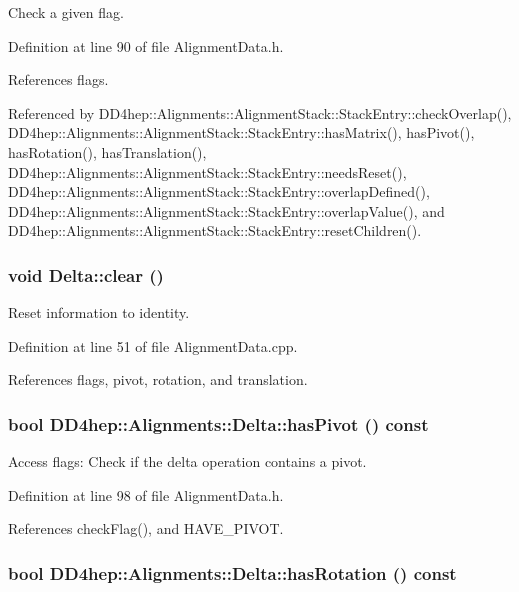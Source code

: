 Check a given flag. 

Definition at line 90 of file AlignmentData.h.

References flags.

Referenced by DD4hep::Alignments::AlignmentStack::StackEntry::checkOverlap(), DD4hep::Alignments::AlignmentStack::StackEntry::hasMatrix(), hasPivot(), hasRotation(), hasTranslation(), DD4hep::Alignments::AlignmentStack::StackEntry::needsReset(), DD4hep::Alignments::AlignmentStack::StackEntry::overlapDefined(), DD4hep::Alignments::AlignmentStack::StackEntry::overlapValue(), and DD4hep::Alignments::AlignmentStack::StackEntry::resetChildren().\hypertarget{class_d_d4hep_1_1_alignments_1_1_delta_a7262de6cf3b79dea8fd3b7ff86e10e10}{
\subsubsection[{clear}]{\setlength{\rightskip}{0pt plus 5cm}void Delta::clear ()}}
\label{class_d_d4hep_1_1_alignments_1_1_delta_a7262de6cf3b79dea8fd3b7ff86e10e10}


Reset information to identity. 

Definition at line 51 of file AlignmentData.cpp.

References flags, pivot, rotation, and translation.\hypertarget{class_d_d4hep_1_1_alignments_1_1_delta_ad50ffdd1939dad697c42040102309a29}{
\subsubsection[{hasPivot}]{\setlength{\rightskip}{0pt plus 5cm}bool DD4hep::Alignments::Delta::hasPivot () const}}
\label{class_d_d4hep_1_1_alignments_1_1_delta_ad50ffdd1939dad697c42040102309a29}


Access flags: Check if the delta operation contains a pivot. 

Definition at line 98 of file AlignmentData.h.

References checkFlag(), and HAVE\_\-PIVOT.\hypertarget{class_d_d4hep_1_1_alignments_1_1_delta_a0a152e2828b449449094100ba4efb4c6}{
\subsubsection[{hasRotation}]{\setlength{\rightskip}{0pt plus 5cm}bool DD4hep::Alignments::Delta::hasRotation () const}}
\label{class_d_d4hep_1_1_alignments_1_1_delta_a0a152e2828b449449094100ba4efb4c6}


